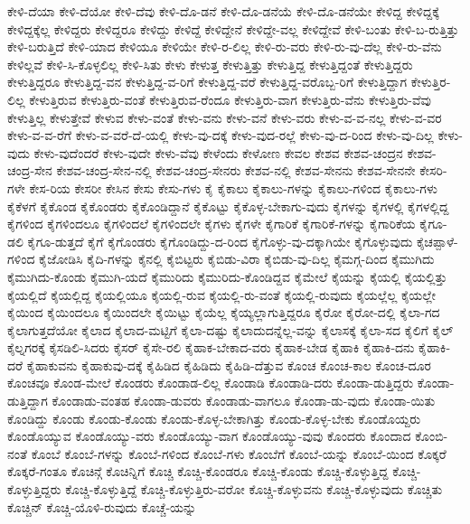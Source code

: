 {ಕೇಳಿ-ದೆಯಾ
ಕೇಳಿ-ದೆಯೋ
ಕೇಳಿ-ದೆವು
ಕೇಳಿ-ದೊ-ಡನೆ
ಕೇಳಿ-ದೊ-ಡನೆಯೆ
ಕೇಳಿ-ದೊ-ಡನೆಯೇ
ಕೇಳಿದ್ದ
ಕೇಳಿದ್ದಕ್ಕೆ
ಕೇಳಿದ್ದಕ್ಕೆಲ್ಲ
ಕೇಳಿದ್ದರು
ಕೇಳಿದ್ದರೂ
ಕೇಳಿದ್ದು
ಕೇಳಿದ್ದೆ
ಕೇಳಿದ್ದೇನೆ
ಕೇಳಿದ್ದೇ-ವಲ್ಲ
ಕೇಳಿದ್ದೇವೆ
ಕೇಳಿ-ಬಂತು
ಕೇಳಿ-ಬ-ರುತ್ತಿತ್ತು
ಕೇಳಿ-ಬರುತ್ತಿದೆ
ಕೇಳಿ-ಯಾದ
ಕೇಳಿಯೂ
ಕೇಳಿಯೇ
ಕೇಳಿ-ರ-ಲಿಲ್ಲ
ಕೇಳಿ-ರು-ವರು
ಕೇಳಿ-ರು-ವು-ದೆಲ್ಲ
ಕೇಳಿ-ರು-ವೆನು
ಕೇಳಿಲ್ಲವೆ
ಕೇಳಿ-ಸಿ-ಕೊಳ್ಳಲಿಲ್ಲ
ಕೇಳಿ-ಸಿತು
ಕೇಳು
ಕೇಳುತ್ತ
ಕೇಳುತ್ತಿತ್ತು
ಕೇಳುತ್ತಿದ್ದ
ಕೇಳುತ್ತಿದ್ದಂತೆ
ಕೇಳುತ್ತಿದ್ದರು
ಕೇಳುತ್ತಿದ್ದರೂ
ಕೇಳುತ್ತಿದ್ದ-ವನ
ಕೇಳುತ್ತಿದ್ದ-ವ-ರಿಗೆ
ಕೇಳುತ್ತಿದ್ದ-ವರೆ
ಕೇಳುತ್ತಿದ್ದ-ವರೊಬ್ಬ-ರಿಗೆ
ಕೇಳುತ್ತಿದ್ದಾಗ
ಕೇಳುತ್ತಿರ-ಲಿಲ್ಲ
ಕೇಳುತ್ತಿರುವ
ಕೇಳುತ್ತಿರು-ವಂತೆ
ಕೇಳುತ್ತಿರುವ-ರೆಂದೂ
ಕೇಳುತ್ತಿರು-ವಾಗ
ಕೇಳುತ್ತಿರು-ವೆನು
ಕೇಳುತ್ತಿರು-ವೆವು
ಕೇಳುತ್ತಿಲ್ಲ
ಕೇಳುತ್ತೇವೆ
ಕೇಳುವ
ಕೇಳು-ವಂತೆ
ಕೇಳು-ವನು
ಕೇಳು-ವನೆ
ಕೇಳು-ವರು
ಕೇಳು-ವ-ವ-ನಲ್ಲ
ಕೇಳು-ವ-ವರ
ಕೇಳು-ವ-ವ-ರೆಗೆ
ಕೇಳು-ವ-ವರೆ-ದೆ-ಯಲ್ಲಿ
ಕೇಳು-ವು-ದಕ್ಕೆ
ಕೇಳು-ವುದ-ರಲ್ಲೆ
ಕೇಳು-ವು-ದ-ರಿಂದ
ಕೇಳು-ವು-ದಿಲ್ಲ
ಕೇಳು-ವುದು
ಕೇಳು-ವುದೆಂದರೆ
ಕೇಳು-ವುದೇ
ಕೇಳು-ವೆವು
ಕೇಳೆಂದು
ಕೇಳೋಣ
ಕೇವಲ
ಕೇಶವ
ಕೇಶವ-ಚಂದ್ರನ
ಕೇಶವ-ಚಂದ್ರ-ಸೇನ
ಕೇಶವ-ಚಂದ್ರ-ಸೇನ-ನಲ್ಲಿ
ಕೇಶವ-ಚಂದ್ರ-ಸೇನರು
ಕೇಶವ-ನಲ್ಲಿ
ಕೇಶವ-ಸೇನನು
ಕೇಶವ-ಸೇನನೇ
ಕೇಸರಿ-ಗಳೇ
ಕೇಸ-ರಿಯ
ಕೇಸರೀ
ಕೇಸಿನ
ಕೇಸು
ಕೇಸು-ಗಳು
ಕೈ
ಕೈಕಾಲು
ಕೈಕಾಲು-ಗಳನ್ನು
ಕೈಕಾಲು-ಗಳಿಂದ
ಕೈಕಾಲು-ಗಳು
ಕೈಕೆಳಗೆ
ಕೈಕೊಂಡ
ಕೈಕೊಂಡರು
ಕೈಕೊಂಡಿದ್ದಾನೆ
ಕೈಕೊಟ್ಟು
ಕೈಕೊಳ್ಳ-ಬೇಕಾಗು-ವುದು
ಕೈಗಳನ್ನು
ಕೈಗಳಲ್ಲಿ
ಕೈಗಳಲ್ಲಿದ್ದ
ಕೈಗಳಿಂದ
ಕೈಗಳಿಂದಲೂ
ಕೈಗಳಿಂದಲೆ
ಕೈಗಳಿಂದಲೇ
ಕೈಗಳು
ಕೈಗಳೇ
ಕೈಗಾರಿಕೆ
ಕೈಗಾರಿಕೆ-ಗಳನ್ನು
ಕೈಗಾರಿಕೆಯ
ಕೈಗೂ-ಡಲಿ
ಕೈಗೂ-ಡುತ್ತದೆ
ಕೈಗೆ
ಕೈಗೊಂಡರು
ಕೈಗೊಂಡಿದ್ದು-ದ-ರಿಂದ
ಕೈಗೊಳ್ಳು-ವು-ದಕ್ಕಾಗಿಯೇ
ಕೈಗೊಳ್ಳುವುದು
ಕೈಚಪ್ಪಾಳೆ-ಗಳಿಂದ
ಕೈಜೋಡಿಸಿ
ಕೈದಿ-ಗಳನ್ನು
ಕೈನಲ್ಲಿ
ಕೈಬಿಟ್ಟರು
ಕೈಬಿಡು-ವಿರಾ
ಕೈಬಿಡು-ವು-ದಿಲ್ಲ
ಕೈಮಗ್ಗ-ದಿಂದ
ಕೈಮುಗಿದು
ಕೈಮುಗಿದು-ಕೊಂಡು
ಕೈಮುಗಿ-ಯದೆ
ಕೈಮುರಿದು
ಕೈಮುರಿದು-ಕೊಂಡಿದ್ದವ
ಕೈಮೇಲೆ
ಕೈಯನ್ನು
ಕೈಯಲ್ಲಿ
ಕೈಯಲ್ಲಿತ್ತು
ಕೈಯಲ್ಲಿದೆ
ಕೈಯಲ್ಲಿದ್ದ
ಕೈಯಲ್ಲಿಯೂ
ಕೈಯಲ್ಲಿ-ರುವ
ಕೈಯಲ್ಲಿ-ರು-ವಂತೆ
ಕೈಯಲ್ಲಿ-ರುವುದು
ಕೈಯಲ್ಲೆಲ್ಲ
ಕೈಯಲ್ಲೇ
ಕೈಯಿಂದ
ಕೈಯಿಂದಲೂ
ಕೈಯಿಂದಲೇ
ಕೈಯಿಟ್ಟು
ಕೈಯೆಲ್ಲ
ಕೈಯ್ಯಲ್ಲಾಗುತ್ತಿದ್ದರೂ
ಕೈರೋ
ಕೈರೋ-ದಲ್ಲಿ
ಕೈಲಾ-ಗದ
ಕೈಲಾಗುತ್ತದೆಯೋ
ಕೈಲಾದ
ಕೈಲಾದ-ಮಟ್ಟಿಗೆ
ಕೈಲಾ-ದಷ್ಟು
ಕೈಲಾದುದನ್ನೆಲ್ಲ-ವನ್ನು
ಕೈಲಾಸಕ್ಕೆ
ಕೈಲಾ-ಸದ
ಕೈಲಿಗೆ
ಕೈಲ್
ಕೈಲ್ನಗರಕ್ಕೆ
ಕೈಸಡಿಲಿ-ಸಿದರು
ಕೈಸರ್
ಕೈಸೇ-ರಲಿ
ಕೈಹಾಕ-ಬೇಕಾದ-ವರು
ಕೈಹಾಕ-ಬೇಡ
ಕೈಹಾಕಿ
ಕೈಹಾಕಿ-ದನು
ಕೈಹಾಕಿ-ದರೆ
ಕೈಹಾಕುವನು
ಕೈಹಾಕುವು-ದಕ್ಕೆ
ಕೈಹಿಡಿದ
ಕೈಹಿಡಿದು
ಕೈಹಿಡಿ-ದೆತ್ತುವ
ಕೊಂಚ
ಕೊಂಚ-ಕಾಲ
ಕೊಂಚ-ದೂರ
ಕೊಂಚವೂ
ಕೊಂಡ-ಮೇಲೆ
ಕೊಂಡರು
ಕೊಂಡಾಡ-ಲಿಲ್ಲ
ಕೊಂಡಾಡಿ
ಕೊಂಡಾಡಿ-ದರು
ಕೊಂಡಾ-ಡುತ್ತಿದ್ದರು
ಕೊಂಡಾ-ಡುತ್ತಿದ್ದಾಗ
ಕೊಂಡಾಡು-ವಂತಹ
ಕೊಂಡಾ-ಡುವರು
ಕೊಂಡಾಡು-ವಾಗಲೂ
ಕೊಂಡಾ-ಡು-ವುದು
ಕೊಂಡಾ-ಯಿತು
ಕೊಂಡಿದ್ದು
ಕೊಂಡು
ಕೊಂಡು-ಕೊಂಡು
ಕೊಂಡು-ಕೊಳ್ಳ-ಬೇಕಾಗಿತ್ತು
ಕೊಂಡು-ಕೊಳ್ಳ-ಬೇಕು
ಕೊಂಡೊಯ್ದರು
ಕೊಂಡೊಯ್ಯುವ
ಕೊಂಡೊಯ್ಯು-ವರು
ಕೊಂಡೊಯ್ಯು-ವಾಗ
ಕೊಂಡೊಯ್ಯು-ವುವು
ಕೊಂದರು
ಕೊಂದಾದ
ಕೊಂಬಿ-ನಂತೆ
ಕೊಂಬೆ
ಕೊಂಬೆ-ಗಳನ್ನು
ಕೊಂಬೆ-ಗಳಿಂದ
ಕೊಂಬೆ-ಗಳು
ಕೊಂಬೆಗೆ
ಕೊಂಬೆ-ಯನ್ನು
ಕೊಂಬೆ-ಯಿಂದ
ಕೊಕ್ಕರೆ
ಕೊಕ್ಕರೆ-ಗಂತೂ
ಕೊಚಿನ್ಗೆ
ಕೊಚಿನ್ನಿಗೆ
ಕೊಚ್ಚಿ
ಕೊಚ್ಚಿ-ಕೊಂಡರೂ
ಕೊಚ್ಚಿ-ಕೊಂಡು
ಕೊಚ್ಚಿ-ಕೊಳ್ಳುತ್ತಿದ್ದ
ಕೊಚ್ಚಿ-ಕೊಳ್ಳುತ್ತಿದ್ದರು
ಕೊಚ್ಚಿ-ಕೊಳ್ಳುತ್ತಿದ್ದೆ
ಕೊಚ್ಚಿ-ಕೊಳ್ಳುತ್ತಿರು-ವರೋ
ಕೊಚ್ಚಿ-ಕೊಳ್ಳುವನು
ಕೊಚ್ಚಿ-ಕೊಳ್ಳುವುದು
ಕೊಚ್ಚಿತು
ಕೊಚ್ಚಿನ್
ಕೊಚ್ಚಿ-ಯೊಳಿ-ರುವುದು
ಕೊಚ್ಚೆ-ಯನ್ನು
}
